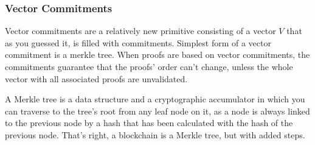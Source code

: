\subsubsection{Vector Commitments}
Vector commitments are a relatively new primitive consisting of a vector \(V\) that as you guessed it, is filled with commitments. Simplest form of a vector commitment is a merkle tree. When proofs are based on vector commitments, the commitments guarantee that the proofs' order can't change, unless the whole vector with all associated proofs are unvalidated.

A Merkle tree is a data structure and a cryptographic accumulator in which you can traverse to the tree's root from any leaf node on it, as a node is always linked to the previous node by a hash that has been calculated with the hash of the previous node. That's right, a blockchain is a Merkle tree, but with added steps.

